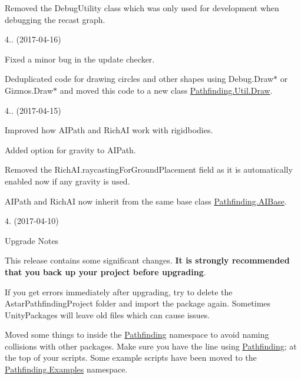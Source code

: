 \begin{DoxyItemize}
\begin{DoxyItemize}
\item Removed the Debug\+Utility class which was only used for development when debugging the recast graph.
\end{DoxyItemize}
\item 4.. (2017-\/04-\/16)
\begin{DoxyItemize}
\item Fixed a minor bug in the update checker.
\item Deduplicated code for drawing circles and other shapes using Debug.\+Draw$\ast$ or Gizmos.\+Draw$\ast$ and moved this code to a new class \mbox{\hyperlink{class_pathfinding_1_1_util_1_1_draw}{Pathfinding.\+Util.\+Draw}}.
\end{DoxyItemize}
\item 4.. (2017-\/04-\/15)
\begin{DoxyItemize}
\item Improved how A\+I\+Path and Rich\+AI work with rigidbodies.
\item Added option for gravity to A\+I\+Path.
\item Removed the Rich\+A\+I.\+raycasting\+For\+Ground\+Placement field as it is automatically enabled now if any gravity is used.
\item A\+I\+Path and Rich\+AI now inherit from the same base class \mbox{\hyperlink{class_pathfinding_1_1_a_i_base}{Pathfinding.\+A\+I\+Base}}.
\end{DoxyItemize}
\item 4. (2017-\/04-\/10)
\begin{DoxyItemize}
\item Upgrade Notes
\begin{DoxyItemize}
\item This release contains some significant changes. {\bfseries{It is strongly recommended that you back up your project before upgrading}}.
\item If you get errors immediately after upgrading, try to delete the Astar\+Pathfinding\+Project folder and import the package again. Sometimes Unity\+Packages will leave old files which can cause issues.
\item Moved some things to inside the \mbox{\hyperlink{namespace_pathfinding}{Pathfinding}} namespace to avoid naming collisions with other packages. Make sure you have the line \textquotesingle{}using \mbox{\hyperlink{namespace_pathfinding}{Pathfinding}};\textquotesingle{} at the top of your scripts. Some example scripts have been moved to the \mbox{\hyperlink{namespace_pathfinding_1_1_examples}{Pathfinding.\+Examples}} namespace.

\end{DoxyItemize}
\end{DoxyItemize}
\end{DoxyItemize}
